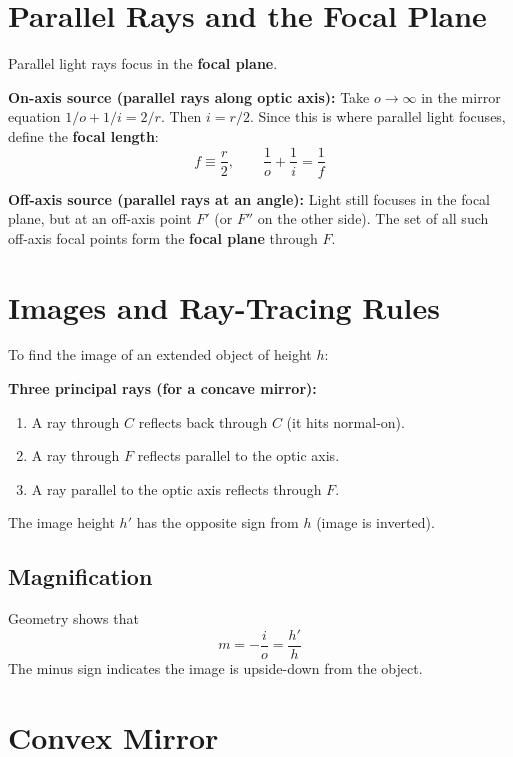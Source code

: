 \documentclass[11pt]{report}
\begin{document}
\section{Parallel Rays and the Focal Plane}

Parallel light rays focus in the \textbf{focal plane}.

\textbf{On-axis source (parallel rays along optic axis):} Take $o \to \infty$ in the mirror equation $1/o + 1/i = 2/r$. Then $i = r/2$. Since this is where parallel light focuses, define the \textbf{focal length}:
\begin{equation}
\boxed{f \equiv \frac{r}{2}, \qquad \frac{1}{o} + \frac{1}{i} = \frac{1}{f}}
\end{equation}

\textbf{Off-axis source (parallel rays at an angle):} Light still focuses in the focal plane, but at an off-axis point $F'$ (or $F''$ on the other side). The set of all such off-axis focal points form the \textbf{focal plane} through $F$.

\section{Images and Ray-Tracing Rules}

To find the image of an extended object of height $h$:

\textbf{Three principal rays (for a concave mirror):}
\begin{enumerate}
    \item A ray through $C$ reflects back through $C$ (it hits normal-on).
    \item A ray through $F$ reflects parallel to the optic axis.
    \item A ray parallel to the optic axis reflects through $F$.
\end{enumerate}

The image height $h'$ has the opposite sign from $h$ (image is inverted).

\subsection*{Magnification}

Geometry shows that
\begin{equation}
\boxed{m = -\frac{i}{o} = \frac{h'}{h}}
\end{equation}
The minus sign indicates the image is upside-down from the object.

\section{Convex Mirror}
\end{document}

